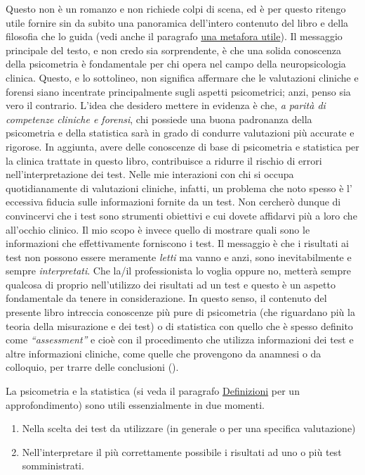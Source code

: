 \documentclass[
  italian,
  letterpaper,
  paper=6in:9in,
  pagesize=pdftex,
  headinclude=on,
  footinclude=on,
  11pt]{scrbook}
\providecommand{\tightlist}{%
  \setlength{\itemsep}{0pt}\setlength{\parskip}{0pt}}
\begin{document}
Questo non è un romanzo e non richiede colpi di scena, ed è per questo
ritengo utile fornire sin da subito una panoramica dell'intero contenuto
del libro e della filosofia che lo guida (vedi anche il paragrafo
\hyperref[una-metafora-utile]{una metafora utile}). Il messaggio
principale del testo, e non credo sia sorprendente, è che una solida
conoscenza della psicometria è fondamentale per chi opera nel campo
della neuropsicologia clinica. Questo, e lo sottolineo, non significa
affermare che le valutazioni cliniche e forensi siano incentrate
principalmente sugli aspetti psicometrici; anzi, penso sia vero il
contrario. L'idea che desidero mettere in evidenza è che, \emph{a parità
di competenze cliniche e forensi}, chi possiede una buona padronanza
della psicometria e della statistica sarà in grado di condurre
valutazioni più accurate e rigorose. In aggiunta, avere delle conoscenze
di base di psicometria e statistica per la clinica trattate in questo
libro, contribuisce a ridurre il rischio di errori nell'interpretazione
dei test. Nelle mie interazioni con chi si occupa quotidianamente di
valutazioni cliniche, infatti, un problema che noto spesso è l'
eccessiva fiducia sulle informazioni fornite da un test. Non cercherò
dunque di convincervi che i test sono strumenti obiettivi e cui dovete
affidarvi più a loro che all'occhio clinico. Il mio scopo è invece
quello di mostrare quali sono le informazioni che effettivamente
forniscono i test. Il messaggio è che i risultati ai test non possono
essere meramente \emph{letti} ma vanno e anzi, sono inevitabilmente e
sempre \emph{interpretati}. Che la/il professionista lo voglia oppure
no, metterà sempre qualcosa di proprio nell'utilizzo dei risultati ad un
test e questo è un aspetto fondamentale da tenere in considerazione. In
questo senso, il contenuto del presente libro intreccia conoscenze più
pure di psicometria (che riguardano più la teoria della misurazione e
dei test) o di statistica con quello che è spesso definito come
\emph{``assessment''} e cioè con il procedimento che utilizza
informazioni dei test e altre informazioni cliniche, come quelle che
provengono da anamnesi o da colloquio, per trarre delle conclusioni
(\cite{chiorri2023teoria}).

La psicometria e la statistica (si veda il paragrafo
\hyperref[Definizioni]{Definizioni} per un approfondimento) sono utili
essenzialmente in due momenti.

\begin{enumerate}
\def\labelenumi{\arabic{enumi}.}
\tightlist
\item
  Nella scelta dei test da utilizzare (in generale o per una specifica
  valutazione)
\item
  Nell'interpretare il più correttamente possibile i risultati ad uno o
  più test somministrati.
\end{enumerate}
\end{document}
